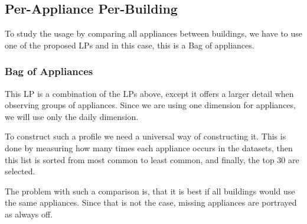 


\subsection{Per-Appliance Per-Building}

To study the usage by comparing all appliances between buildings,
we have to use one of the proposed LPs and in this case, this is a Bag of appliances.

\subsubsection{Bag of Appliances}

This LP is a combination of the LPs above,
except it offers a larger detail when observing groups of appliances.
Since we are using one dimension for appliances, we will use only the daily dimension.

To construct such a profile we need a universal way of constructing it.
This is done by measuring how many times each appliance occurs in the datasets,
then this list is sorted from most common to least common, and finally, the top 30 are selected.

The problem with such a comparison is, that it is best 
if all buildings would use the same appliances.
Since that is not the case, missing appliances are portrayed as always off. 

